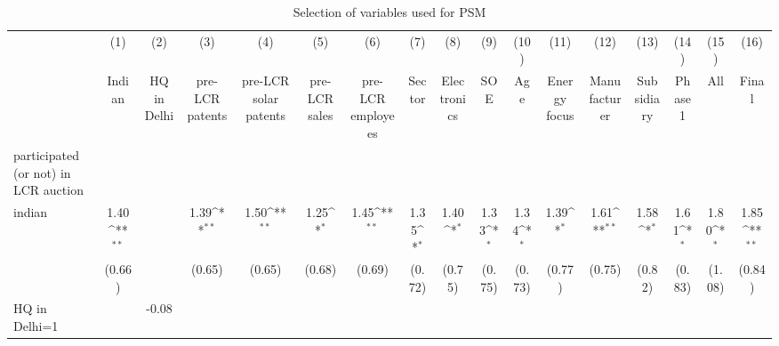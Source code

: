 \begin{table}[htbp]\centering
\def\sym#1{\ifmmode^{#1}\else\(^{#1}\)\fi}
\caption{Selection of variables used for PSM}
\begin{tabular*}{0.8\hsize}{@{\hskip\tabcolsep\extracolsep\fill}l*{16}{c}}
\hline\hline
                    &\multicolumn{1}{c}{(1)}&\multicolumn{1}{c}{(2)}&\multicolumn{1}{c}{(3)}&\multicolumn{1}{c}{(4)}&\multicolumn{1}{c}{(5)}&\multicolumn{1}{c}{(6)}&\multicolumn{1}{c}{(7)}&\multicolumn{1}{c}{(8)}&\multicolumn{1}{c}{(9)}&\multicolumn{1}{c}{(10)}&\multicolumn{1}{c}{(11)}&\multicolumn{1}{c}{(12)}&\multicolumn{1}{c}{(13)}&\multicolumn{1}{c}{(14)}&\multicolumn{1}{c}{(15)}&\multicolumn{1}{c}{(16)}\\
                    &\multicolumn{1}{c}{Indian}&\multicolumn{1}{c}{HQ in Delhi}&\multicolumn{1}{c}{pre-LCR patents}&\multicolumn{1}{c}{pre-LCR solar patents}&\multicolumn{1}{c}{pre-LCR sales}&\multicolumn{1}{c}{pre-LCR employees}&\multicolumn{1}{c}{Sector}&\multicolumn{1}{c}{Electronics}&\multicolumn{1}{c}{SOE}&\multicolumn{1}{c}{Age}&\multicolumn{1}{c}{Energy focus}&\multicolumn{1}{c}{Manufacturer}&\multicolumn{1}{c}{Subsidiary}&\multicolumn{1}{c}{Phase 1}&\multicolumn{1}{c}{All}&\multicolumn{1}{c}{Final}\\
\hline
participated (or not) in LCR auction&                     &                     &                     &                     &                     &                     &                     &                     &                     &                     &                     &                     &                     &                     &                     &                     \\
indian              &        1.40\sym{**} &                     &        1.39\sym{**} &        1.50\sym{**} &        1.25\sym{*}  &        1.45\sym{**} &        1.35\sym{*}  &        1.40\sym{*}  &        1.33\sym{*}  &        1.34\sym{*}  &        1.39\sym{*}  &        1.61\sym{**} &        1.58\sym{*}  &        1.61\sym{*}  &        1.80\sym{*}  &        1.85\sym{**} \\
                    &      (0.66)         &                     &      (0.65)         &      (0.65)         &      (0.68)         &      (0.69)         &      (0.72)         &      (0.75)         &      (0.75)         &      (0.73)         &      (0.77)         &      (0.75)         &      (0.82)         &      (0.83)         &      (1.08)         &      (0.84)         \\
[1em]
HQ in Delhi=1       &                     &       -0.08         &                     &                     &                     &                     &                     &                     &                     &                     &                     &                     &                     &                     &                     &                     \\

\end{tabular*}
\end{table}
